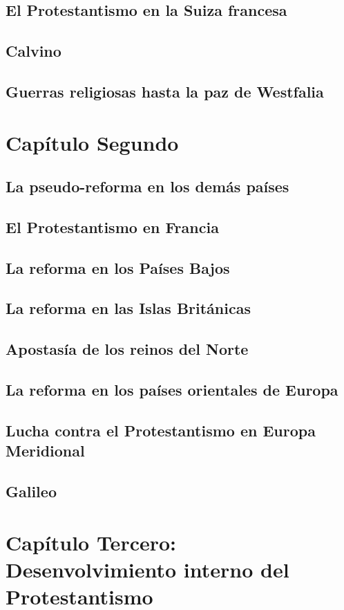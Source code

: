 \raggedbottom{} \documentclass[12pt, a4paper]{book}
\begin{document}
\section{El Protestantismo en la Suiza francesa}
\section{Calvino}
\section{Guerras religiosas hasta la paz de Westfalia}
\chapter{Capítulo Segundo}
\section{La pseudo-reforma en los demás países}
\section{El Protestantismo en Francia}
\section{La reforma en los Países Bajos}
\section{La reforma en las Islas Británicas}
\section{Apostasía de los reinos del Norte}
\section{La reforma en los países orientales de Europa}
\section{Lucha contra el Protestantismo en Europa Meridional}
\section{Galileo}
\chapter{Capítulo Tercero: Desenvolvimiento interno del Protestantismo}
\end{document}
